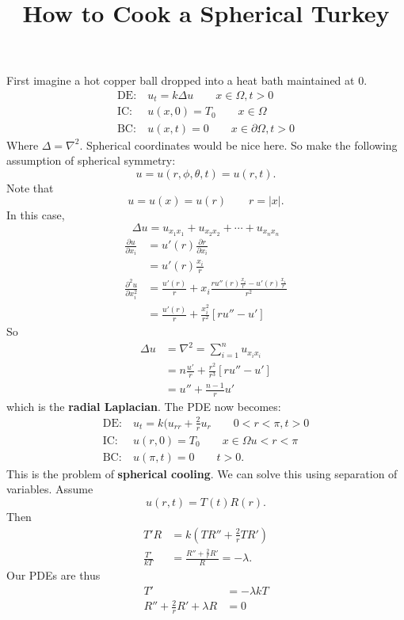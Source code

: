 \documentclass[cm]{article}
\title{How to Cook a Spherical Turkey}
\begin{document}
\maketitle
First imagine a hot copper ball dropped into a heat bath maintained at $0$.
\begin{align*}
\text{DE:}&~ u_t = k \Delta u \qquad x \in \Omega, t > 0 \\
\text{IC:}&~ u(x,0) = T_0 \qquad x \in \Omega \\
\text{BC:}&~ u(x,t) = 0 \qquad x \in \partial \Omega, t > 0
\end{align*}
Where $\Delta = \nabla^2$.
Spherical coordinates would be nice here. So make the following assumption of
spherical symmetry:
$$u = u(r, \phi, \theta, t) = u(r,t).$$
Note that
$$u = u(x) = u(r) \qquad r = |x|.$$
In this case,
$$\Delta u = u_{x_1x_1} + u_{x_2x_2} + \cdots + u_{x_nx_n}$$
\begin{align*}
\frac{\partial u}{\partial x_i} &= u'(r) \frac{\partial r}{\partial x_i} \\
        &= u'(r) \frac{x_i}{r} \\
\frac{\partial^2 u}{\partial x_i^2} &= \frac{u'(r)}{r} + x_i \frac{r u''(r)
    \frac{x_i}{r} - u'(r) \frac{x_i}{r}}{r^2} \\
    &= \frac{u'(r)}{r} + \frac{x_i^2}{r^2} [ ru'' - u']
\end{align*}
So
\begin{align*}
\Delta u &= \nabla^2 = \sum_{i = 1}^{n} u_{x_ix_i} \\
            &= n \frac{u'}{r} + \frac{r^2}{r^3} [ru'' - u'] \\
            &= u'' + \frac{n-1}{r} u'
\end{align*}
which is the {\bf radial Laplacian}.
The PDE now becomes:
\begin{align*}
\text{DE:}&~ u_t = k(u_{rr} + \frac{2}{r} u_r \qquad 0 < r < \pi, t > 0 \\
\text{IC:}&~ u(r,0) = T_0 \qquad x \in \Omega u < r < \pi\\
\text{BC:}&~ u(\pi,t) = 0 \qquad t > 0.
\end{align*}
This is the problem of {\bf spherical cooling}. We can solve this using
separation of variables. Assume
$$u(r,t) = T(t) R(r).$$
Then
\begin{align*}
T'R &= k(TR'' + \frac{2}{r} T R') \\
\frac{T'}{kT} &= \frac{R'' + \frac{2}{r} R'}{R} = - \lambda.
\end{align*}
Our PDEs are thus
\begin{align*}
T' &= - \lambda k T \\
R'' + \frac{2}{r} R' + \lambda R &= 0
\end{align*}
\end{document}
